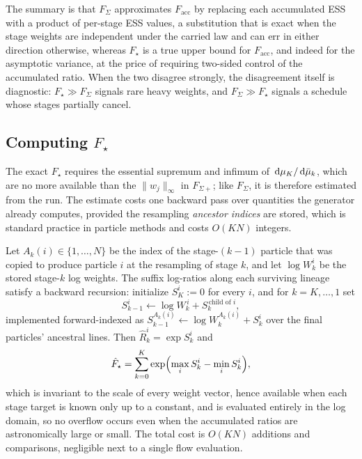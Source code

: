 \documentclass{article}
\begin{document}
{The summary is that $F_\Sigma$ approximates $F_{\mathrm{acc}}$ by replacing each accumulated ESS with a product of per-stage ESS values, a substitution that is exact when the stage weights are independent under the carried law and can err in either direction otherwise, whereas $F_\star$ is a true upper bound for $F_{\mathrm{acc}}$, and indeed for the asymptotic variance, at the price of requiring two-sided control of the accumulated ratio. When the two disagree strongly, the disagreement itself is diagnostic: $F_\star\gg F_\Sigma$ signals rare heavy weights, and $F_\Sigma\gg F_\star$ signals a schedule whose stages partially cancel.

\subsection*{Computing $F_\star$}

The exact $F_\star$ requires the essential supremum and infimum of $\,\mathrm d\mu_K/\,\mathrm d\bar\mu_k$, which are no more available than the $\lVert w_j\rVert_\infty$ in $F_{\Sigma+}$; like $F_\Sigma$, it is therefore estimated from the run. The estimate costs one backward pass over quantities the generator already computes, provided the resampling \emph{ancestor indices} are stored, which is standard practice in particle methods and costs $O(KN)$ integers.

Let $A_k(i)\in\{1,\dots,N\}$ be the index of the stage-$(k{-}1)$ particle that was copied to produce particle $i$ at the resampling of stage $k$, and let $\log W_k^i$ be the stored stage-$k$ log weights. The suffix log-ratios along each surviving lineage satisfy a backward recursion: initialize $S_K^i:=0$ for every $i$, and for $k=K,\dots,1$ set
\begin{equation*}
    S_{k-1}^{i} \gets \log W_k^{\,i} + S_k^{\,\text{child of }i},
\end{equation*}
implemented forward-indexed as $S_{k-1}^{A_k(i)}\!\gets\!\log W_k^{A_k(i)}+S_k^{i}$ over the final particles' ancestral lines. Then $\hat R_k^i=\exp S_k^i$ and
\begin{equation*}
    \hat F_\star=\sum_{k=0}^{K}\exp\Bigl(\max_iS_k^i-\min_iS_k^i\Bigr),
\end{equation*}
which is invariant to the scale of every weight vector, hence available when each stage target is known only up to a constant, and is evaluated entirely in the log domain, so no overflow occurs even when the accumulated ratios are astronomically large or small. The total cost is $O(KN)$ additions and comparisons, negligible next to a single flow evaluation.

}
\end{document}
